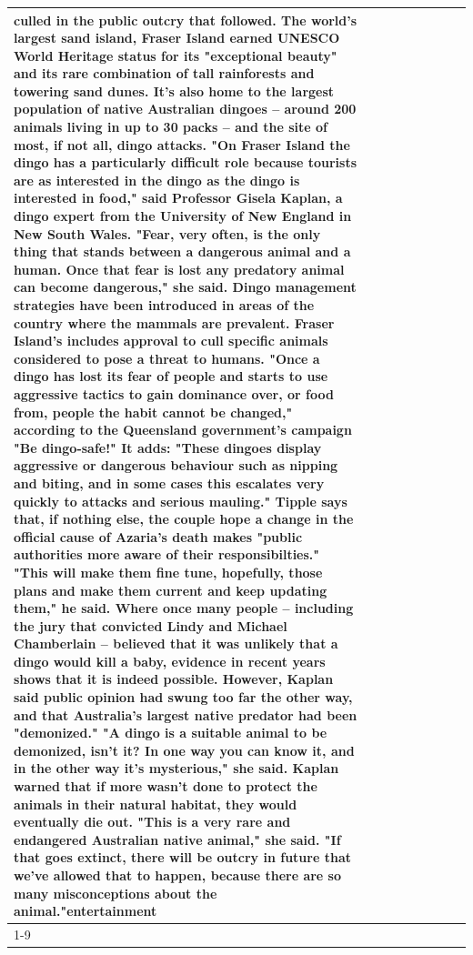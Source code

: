 \begin{table}[H]
\begin{tabular}{lllrlllll}
culled in the public outcry that followed. The world's largest sand island, Fraser Island earned UNESCO World Heritage status for its "exceptional beauty" and its rare combination of tall rainforests and towering sand dunes. It's also home to the largest population of native Australian dingoes -- around 200 animals living in up to 30 packs -- and the site of most, if not all, dingo attacks. "On Fraser Island the dingo has a particularly difficult role because tourists are as interested in the dingo as the dingo is interested in food," said Professor Gisela Kaplan, a dingo expert from the University of New England in New South Wales. "Fear, very often, is the only thing that stands between a dangerous animal and a human. Once that fear is lost any predatory animal can become dangerous," she said. Dingo management strategies have been introduced in areas of the country where the mammals are prevalent. Fraser Island's includes approval to cull specific animals considered to pose a threat to humans. "Once a dingo has lost its fear of people and starts to use aggressive tactics to gain dominance over, or food from, people the habit cannot be changed," according to the Queensland government's campaign "Be dingo-safe!" It adds: "These dingoes display aggressive or dangerous behaviour such as nipping and biting, and in some cases this escalates very quickly to attacks and serious mauling." Tipple says that, if nothing else, the couple hope a change in the official cause of Azaria's death makes "public authorities more aware of their responsibilties." "This will make them fine tune, hopefully, those plans and make them current and keep updating them," he said. Where once many people -- including the jury that convicted Lindy and Michael Chamberlain -- believed that it was unlikely that a dingo would kill a baby, evidence in recent years shows that it is indeed possible. However, Kaplan said public opinion had swung too far the other way, and that Australia's largest native predator had been "demonized." "A dingo is a suitable animal to be demonized, isn't it? In one way you can know it, and in the other way it's mysterious," she said. Kaplan warned that if more wasn't done to protect the animals in their natural habitat, they would eventually die out. "This is a very rare and endangered Australian native animal," she said. "If that goes extinct, there will be outcry in future that we've allowed that to happen, because there are so many misconceptions about the animal."entertainment \\
\cline{1-9}

\end{tabular}
\end{table}
